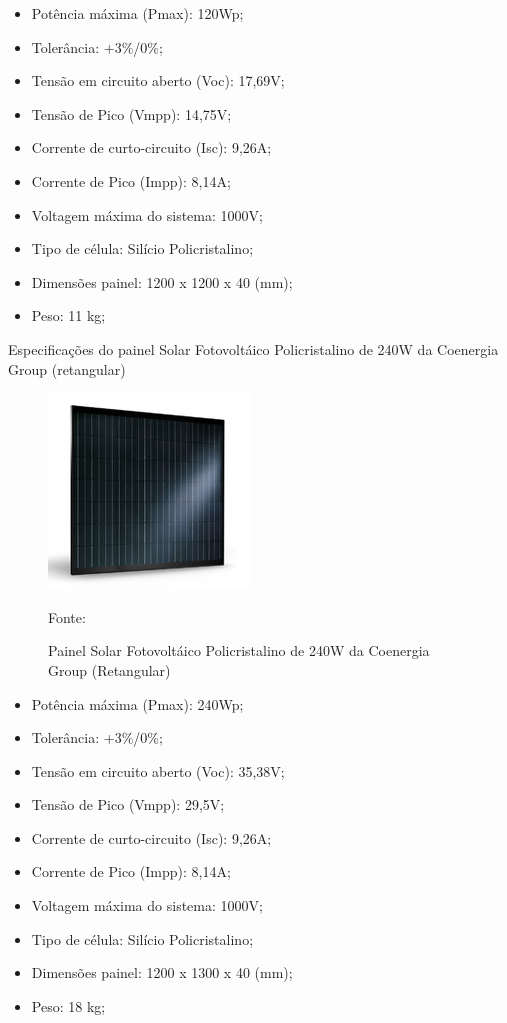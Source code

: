 \begin{itemize}
	\item Potência máxima (Pmax): 120Wp;
	\item Tolerância: +3\%/0\%;
	\item Tensão em circuito aberto (Voc): 17,69V;
	\item Tensão de Pico (Vmpp): 14,75V;
	\item Corrente de curto-circuito (Isc): 9,26A;
	\item Corrente de Pico (Impp): 8,14A;
	\item Voltagem máxima do sistema: 1000V;
	\item Tipo de célula: Silício Policristalino;
	\item Dimensões painel: 1200 x 1200 x 40 (mm);
	\item Peso: 11 kg;
\end{itemize}

Especificações do painel Solar Fotovoltáico Policristalino de 240W da Coenergia Group (retangular)

\begin{figure}[H]
	\centering
	\label{Painel Solar Fotovoltáico Policristalino de 240W da Coenergia Group (Retangular)}
		\includegraphics[keepaspectratio=true,scale=0.9]{solar/3.png}
	\caption{Painel Solar Fotovoltáico Policristalino de 240W da Coenergia Group (Retangular)}
	\small{Fonte: \cite{COENERGIA}}
\end{figure}

\begin{itemize}
	\item Potência máxima (Pmax): 240Wp;
	\item Tolerância: +3\%/0\%;
	\item Tensão em circuito aberto (Voc): 35,38V;
	\item Tensão de Pico (Vmpp): 29,5V;
	\item Corrente de curto-circuito (Isc): 9,26A;
	\item Corrente de Pico (Impp): 8,14A;
	\item Voltagem máxima do sistema: 1000V;
	\item Tipo de célula: Silício Policristalino;	
	\item Dimensões painel: 1200 x 1300 x 40 (mm);
	\item Peso: 18 kg;
\end{itemize}

